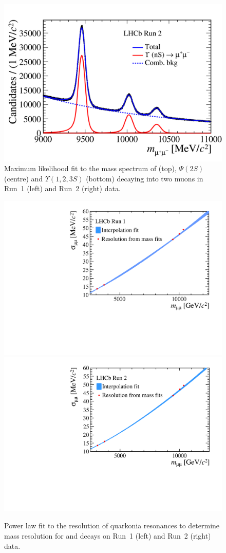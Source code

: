 \begin{figure}[tbp]
     \includegraphics[width= 0.49 \textwidth]{./Figs/BFAnalysis/hidef_Fig13bot.png}
     \caption{Maximum likelihood fit to the mass spectrum of \jpsi (top), $\Psi (2S)$ (centre) and $\Upsilon(1, 2, 3S)$ (bottom) decaying into two muons in Run~1 (left) and Run~2 (right) data.}
     \label{fig:quarkonia}
\end{figure}

\begin{figure}[tbp]
    \centering
     \includegraphics[width= 0.49 \textwidth]{./Figs/BFAnalysis/Run1_res.pdf}
     \includegraphics[width= 0.49 \textwidth]{./Figs/BFAnalysis/Run2_res.pdf}
     \caption{Power law fit to the resolution of quarkonia resonances to determine mass resolution for \bdmumu and \bsmumu decays on Run~1 (left) and Run~2 (right) data.}
     \label{fig:interp}
\end{figure}

